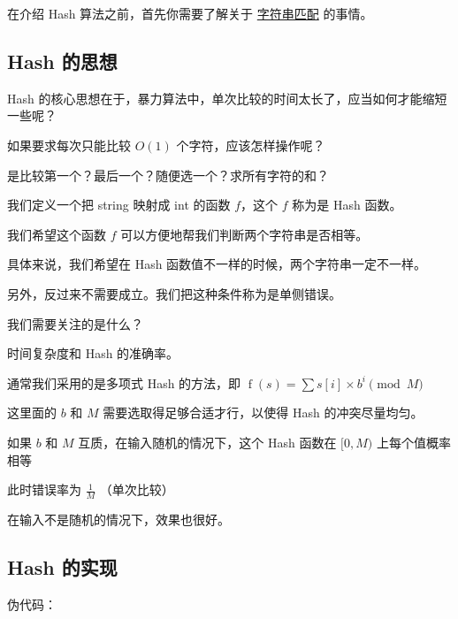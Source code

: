 
在介绍 Hash 算法之前，首先你需要了解关于 \href{/string/match}{字符串匹配} 的事情。

\subsection{Hash 的思想}

Hash 的核心思想在于，暴力算法中，单次比较的时间太长了，应当如何才能缩短一些呢？

如果要求每次只能比较 $O(1)$ 个字符，应该怎样操作呢？

是比较第一个？最后一个？随便选一个？求所有字符的和？

我们定义一个把 string 映射成 int 的函数 $f$，这个 $f$ 称为是 Hash 函数。

我们希望这个函数 $f$ 可以方便地帮我们判断两个字符串是否相等。

具体来说，我们希望在 Hash 函数值不一样的时候，两个字符串一定不一样。

另外，反过来不需要成立。我们把这种条件称为是单侧错误。

我们需要关注的是什么？

时间复杂度和 Hash 的准确率。

通常我们采用的是多项式 Hash 的方法，即 $\operatorname{f}(s) = \sum s[i] \times b^i \pmod M$

这里面的 $b$ 和 $M$ 需要选取得足够合适才行，以使得 Hash 的冲突尽量均匀。

如果 $b$ 和 $M$ 互质，在输入随机的情况下，这个 Hash 函数在 $[0,M)$ 上每个值概率相等

此时错误率为 $\frac1M$ （单次比较）

在输入不是随机的情况下，效果也很好。

\subsection{Hash 的实现}

伪代码：

